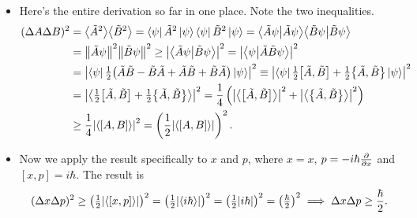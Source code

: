 \documentclass[11pt, a4paper]{article}
\newcommand{\bbraket}[2]{\big \langle {#1} \big | {#2} \big \rangle}  %
\begin{document}
\begin{itemize}
	\item Here's the entire derivation so far in one place. Note the two inequalities.
	\begin{align*}
		(\Delta A \Delta B)^{2} &= \big\langle \tilde{A}^{2} \big\rangle \big\langle \tilde{B}^{2} \big\rangle = \bra{\psi}\tilde{A}^{2}\ket{\psi} \bra{\psi}\tilde{B}^{2}\ket{\psi} = \bbraket{\tilde{A}\psi}{\tilde{A}\psi}\bbraket{\tilde{B}\psi}{\tilde{B}\psi}\\
		&= \norm{\tilde{A}\psi}^{2}\norm{\tilde{B}\psi}^{2} \geq \abs{\bbraket{\tilde{A}\psi}{\tilde{B}\psi}}^{2} = \abs{\bbraket{\psi}{\tilde{A}\tilde{B}\psi}}^{2}\\
		& = \abs{\bra{\psi}\tfrac{1}{2}\big(\tilde{A}\tilde{B} - \tilde{B}\tilde{A} + \tilde{A}\tilde{B} + \tilde{B}\tilde{A}\big)\ket{\psi} }^{2} \equiv  \abs{\bra{\psi}\tfrac{1}{2}\big[\tilde{A}, \tilde{B}\big] + \tfrac{1}{2}\big\{ \tilde{A}, \tilde{B}\big\}\ket{\psi} }^{2} \\
		& = \abs{\left\langle \tfrac{1}{2}\big[\tilde{A}, \tilde{B}\big] + \tfrac{1}{2}\big\{ \tilde{A}, \tilde{B}\big\} \right\rangle}^{2} = \frac{1}{4}\left(\abs{\big\langle \big[\tilde{A}, \tilde{B}\big] \big\rangle}^{2} + \abs{\big\langle \big\{\tilde{A}, \tilde{B}\big\} \big\rangle}^{2}\right) \\
		& \geq \frac{1}{4}\abs{\ev{[A, B]}}^{2} = \left(\frac{1}{2}\abs{\ev{[A, B]}}\right)^{2}.
	\end{align*}
	
	\item Now we apply the result specifically to $ x $ and $ p $, where $ x = x $, $ p = -i\hbar \pdv{}{x} $ and $ [x, p] = i \hbar $. The result is
	\begin{equation*}
		(\Delta x \Delta p)^{2} \geq \left(\tfrac{1}{2}\abs{\langle [x, p] \rangle}\right)^{2} = \left(\tfrac{1}{2}\abs{\langle i \hbar \rangle}\right)^{2} = \left(\tfrac{1}{2}\abs{i\hbar}\right)^{2} = \left(\tfrac{\hbar}{2}\right)^{2} \implies \Delta x \Delta p \geq \frac{\hbar}{2}.
	\end{equation*}

\end{itemize}
\end{document}
